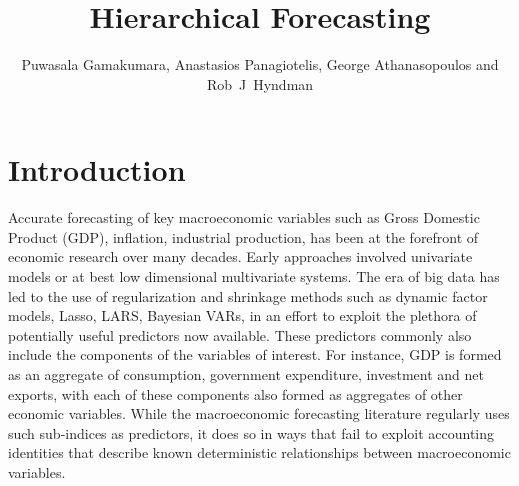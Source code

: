 \documentclass[graybox]{svmult}
\begin{document}
\title*{Hierarchical Forecasting}
\author{Puwasala Gamakumara, Anastasios Panagiotelis, George Athanasopoulos and Rob~J~Hyndman}
%
%
\maketitle

\section{Introduction}\label{sec:intro}
			
Accurate forecasting of key macroeconomic variables such as Gross Domestic Product (GDP), inflation, industrial production, has been at the forefront of economic research over many decades. Early approaches involved univariate models or at best low dimensional multivariate systems. The era of big data has led to the use of regularization and shrinkage methods such as dynamic factor models, Lasso, LARS, Bayesian VARs, in an effort to exploit the plethora of potentially useful predictors now available. These predictors commonly also include the components of the variables of interest. For instance, GDP is formed as an aggregate of consumption, government expenditure, investment and net exports, with each of these components also formed as aggregates of other economic variables. While the macroeconomic forecasting literature regularly uses such sub-indices as predictors, it does so in ways that fail to exploit accounting identities that describe known deterministic relationships between macroeconomic variables.
\end{document}
